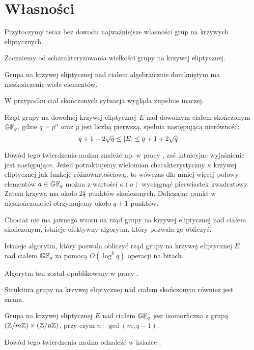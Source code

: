 \section{Własności}

Przytoczymy teraz bez dowodu najważniejsze własności
grup na krzywych eliptycznych.

Zaczniemy od scharakteryzowania wielkości grupy na krzywej eliptycznej.

\begin{fact}
Grupa na krzywej eliptycznej nad ciałem algebraicznie domkniętym
ma nieskończenie wiele elementów.
\end{fact}

W przypadku ciał skończonych sytuacja wygląda zupełnie inaczej.

\begin{theorem}[Hasse]
Rząd grupy na dowolnej krzywej eliptycznej $E$
nad dowolnym ciałem skończonym $\mathbb{GF}_q$,
gdzie $q = p^n$ oraz $p$ jest liczbą pierwszą,
spełnia następującą nierówność:
\begin{equation}
q + 1 - 2\sqrt{q} \leq \lvert E\rvert \leq q + 1 + 2\sqrt{q}
\end{equation}
\end{theorem}

Dowód tego twierdzenia można znaleźć np. w pracy \cite{ecintro1},
zaś intuicyjne wyjaśnienie jest następujące.
Jeżeli potraktujemy wielomian charakterystyczny $\kappa$ krzywej eliptycznej
jak funkcję różnowartościową,
to wówczas dla mniej-więcej połowy elementów $a \in \mathbb{GF}_q$
można z wartości $\kappa(a)$ wyciągnąć pierwiastek kwadratowy.
Zatem krzywa ma około $2\frac{q}{2}$ punktów skończonych.
Doliczając punkt w nieskończoności otrzymujemy około $q + 1$ punktów.

Chociaż nie ma jawnego wzoru
na rząd grupy na krzywej eliptycznej nad ciałem skończonym,
istnieje efektywny algorytm, który pozwala go obliczyć.

\begin{theorem}[Schoof]
Istnieje algorytm, który pozwala obliczyć rząd grupy na krzywej eliptycznej $E$
nad ciałem $\mathbb{GF}_q$ za pomocą $O(\log^8 q)$ operacji na bitach.
\end{theorem}

Algorytm ten został opublikowany w pracy \cite{schoof}.

Struktura grupy na krzywej eliptycznej nad ciałem skończonym
również jest znana.

\begin{theorem}
Grupa na krzywej eliptycznej $E$ nad ciałem $\mathbb{GF}_q$
jest izomorficzna z grupą $(\mathbb{Z}/m\mathbb{Z}) \times (\mathbb{Z}/n\mathbb{Z})$,
przy czym $n \mid \gcd(m, q-1)$.
\end{theorem}

Dowód tego twierdzenia można odnaleźć w ksiażce \cite{silverman}.

